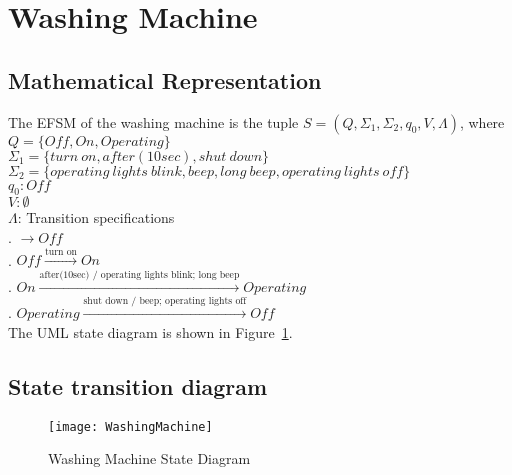 \newpage
\section{Washing Machine}

\subsection{Mathematical Representation}

\noindent The EFSM of the washing machine is the tuple $S = (Q, \Sigma_1, \Sigma_2, q_0, V, \Lambda)$, where\\

\noindent $Q = \{Off, On, Operating\}$\\
\noindent $\Sigma_1 = \{turn~on, after(10sec), shut~down\}$\\
\noindent $\Sigma_2 = \{operating~lights~blink, beep, long~beep, operating~lights~off\}$\\
\noindent $q_0: Off$\\
\noindent $V: \emptyset$\\
\noindent $\Lambda$: Transition specifications\\
. $\rightarrow Off$\\
. $Off \xrightarrow {\text {turn~on}} On$\\
. $On \xrightarrow {\text {after(10sec) / operating lights blink; long beep}} Operating$\\
. $Operating \xrightarrow {\text {shut~down / beep; operating lights off}} Off$\\

\noindent The UML state diagram is shown in Figure~\ref{fig:washingMachine}.


\subsection{State transition diagram}

\begin{figure}[h!]
	\centering
		\texttt{[image: WashingMachine]}
		  \caption{Washing Machine State Diagram}
  \label{fig:washingMachine}
\end{figure}
